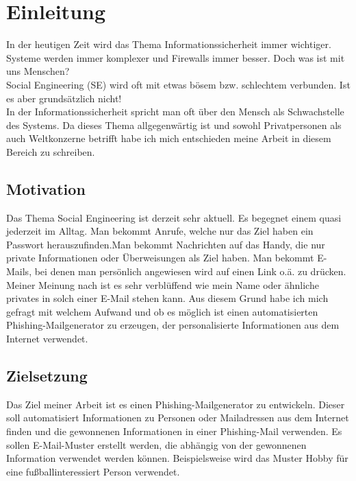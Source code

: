 \chapter{Einleitung}
\label{cha:einleitung}





In der heutigen Zeit wird das Thema Informationssicherheit immer wichtiger. Systeme werden immer komplexer und Firewalls immer besser. Doch was ist mit uns Menschen? \\
Social Engineering (SE) wird oft mit etwas bösem bzw. schlechtem verbunden. Ist es aber grundsätzlich nicht! \\
In der Informationssicherheit spricht man oft über den Mensch als Schwachstelle des Systems. Da dieses Thema allgegenwärtig ist und sowohl Privatpersonen als auch Weltkonzerne betrifft habe ich mich entschieden meine Arbeit in diesem Bereich zu schreiben.


\section{Motivation}
\label {sec:Motivation}
Das Thema Social Engineering ist derzeit sehr aktuell. Es begegnet einem quasi jederzeit im Alltag. Man bekommt Anrufe, welche nur das Ziel haben ein Passwort herauszufinden.Man bekommt Nachrichten auf das Handy, die nur private Informationen oder Überweisungen als Ziel haben. Man bekommt E-Mails, bei denen man persönlich angewiesen wird auf einen Link o.ä. zu drücken. Meiner Meinung nach ist es sehr verblüffend wie mein Name oder ähnliche privates in solch einer E-Mail stehen kann. Aus diesem Grund habe ich mich gefragt mit welchem Aufwand und ob es möglich ist einen automatisierten Phishing-Mailgenerator zu erzeugen, der personalisierte Informationen aus dem Internet verwendet.

\section{Zielsetzung}
\label {sec:Zielsetzung} 
Das Ziel meiner Arbeit ist es einen Phishing-Mailgenerator zu entwickeln. Dieser soll automatisiert Informationen zu Personen oder Mailadressen aus dem Internet finden und die gewonnenen Informationen in einer Phishing-Mail verwenden. Es sollen E-Mail-Muster erstellt werden, die abhängig von der gewonnenen Information verwendet werden können. Beispielsweise wird das Muster Hobby für eine fußballinteressiert Person verwendet.

